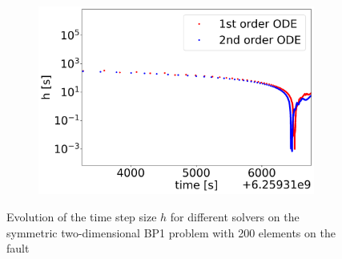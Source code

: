 \begin{figure}[H]
\begin{subfigure}{0.32\textwidth}
    	\includegraphics[width=1\textwidth]{images/TANDEMcompareFormulationstimeEvolutionDTearthquake.png}
    \end{subfigure}
    \caption{Evolution of the time step size $h$ for different solvers on the symmetric two-dimensional BP1 problem with 200 elements on the fault}
    \label{fig:timeEvolutionTANDEM_DT}
\end{figure}


